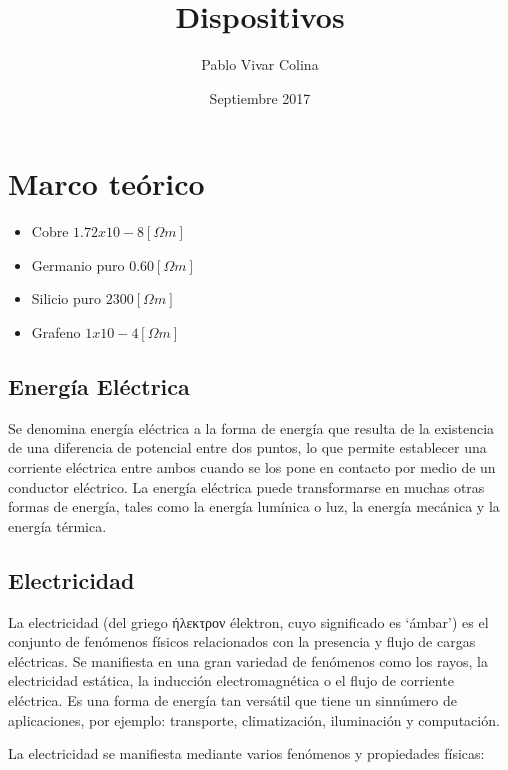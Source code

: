 \documentclass{article}
\title{Dispositivos}
\author{Pablo Vivar Colina}
\date{Septiembre 2017}
\begin{document}
\section{Marco teórico}


\begin{itemize}
    \item Cobre $1.72 x 10-8 [\Omega m]$ \citep{RS}
    \item Germanio puro  $0.60 [\Omega m]$ \citep{RS}
\item Silicio puro $2300 [\Omega m]$ \citep{RS}
\item  Grafeno $1 x 10-4 [\Omega m]$ \citep{Graf}
\end{itemize}


\subsection{Energía Eléctrica}

Se denomina energía eléctrica a la forma de energía que resulta de la existencia de una diferencia de potencial entre dos puntos, lo que permite establecer una corriente eléctrica entre ambos cuando se los pone en contacto por medio de un conductor eléctrico. La energía eléctrica puede transformarse en muchas otras formas de energía, tales como la energía lumínica o luz, la energía mecánica y la energía térmica.\citep{EE}

\subsection{Electricidad}

La electricidad (del griego ήλεκτρον élektron, cuyo significado es ‘ámbar’) es el conjunto de fenómenos físicos relacionados con la presencia y flujo de cargas eléctricas. Se manifiesta en una gran variedad de fenómenos como los rayos, la electricidad estática, la inducción electromagnética o el flujo de corriente eléctrica. Es una forma de energía tan versátil que tiene un sinnúmero de aplicaciones, por ejemplo: transporte, climatización, iluminación y computación.\citep{Elec}

La electricidad se manifiesta mediante varios fenómenos y propiedades físicas:\citep{Elec}
\end{document}
